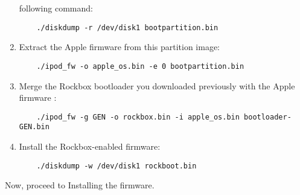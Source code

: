 \begin{enumerate}
    following command:
    \begin{verbatim}
    ./diskdump -r /dev/disk1 bootpartition.bin
    \end{verbatim}
  \item Extract the Apple firmware from this partition image:
    \begin{verbatim}
    ./ipod_fw -o apple_os.bin -e 0 bootpartition.bin
    \end{verbatim}

  \item Merge the Rockbox bootloader you downloaded previously with the Apple
    firmware :
    \begin{verbatim}
    ./ipod_fw -g GEN -o rockbox.bin -i apple_os.bin bootloader-GEN.bin
    \end{verbatim}
  \item
    Install the Rockbox-enabled firmware:
    \begin{verbatim}
    ./diskdump -w /dev/disk1 rockboot.bin
    \end{verbatim}
\end{enumerate}

Now, proceed to  Installing the firmware.

